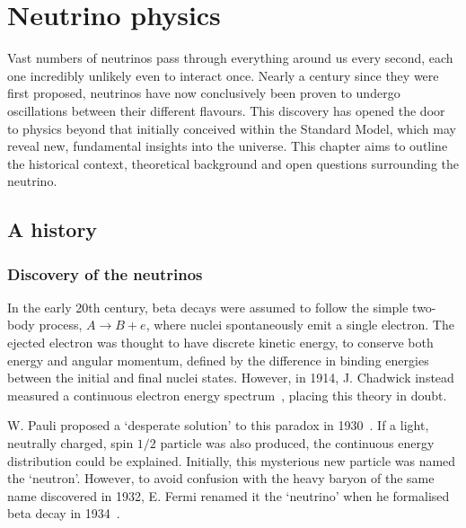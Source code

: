 \chapter{Neutrino physics} %
\label{chap:theory} %

Vast numbers of neutrinos pass through everything around us every second, each one incredibly
unlikely even to interact once. Nearly a century since they were first proposed, neutrinos have
now conclusively been proven to undergo oscillations between their different flavours. This
discovery has opened the door to physics beyond that initially conceived within the Standard
Model, which may reveal new, fundamental insights into the universe. This chapter aims to outline
the historical context, theoretical background and open questions surrounding the neutrino.

\section{A history} %
\label{sec:theory_history} %

\subsection{Discovery of the neutrinos} %
\label{sec:theory_history_neutrinos} %

In the early 20th century, beta decays were assumed to follow the simple two-body process,
$A\rightarrow B + e$, where nuclei spontaneously emit a single electron.  The ejected electron was
thought to have discrete kinetic energy, to conserve both energy and angular momentum, defined by
the difference in binding energies between the initial and final nuclei states. However, in 1914,
J. Chadwick instead measured a continuous electron energy spectrum~\cite{chadwick1914}, placing
this theory in doubt.

W. Pauli proposed a `desperate solution' to this paradox in 1930~\cite{pauli1930}. If a light,
neutrally charged, spin $1/2$ particle was also produced, the continuous energy distribution could
be explained. Initially, this mysterious new particle was named the `neutron'. However, to avoid
confusion with the heavy baryon of the same name discovered in 1932, E. Fermi renamed it the
`neutrino' when he formalised beta decay in 1934~\cite{fermi1934}.

